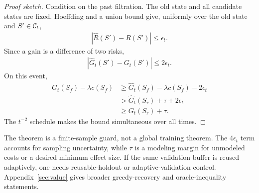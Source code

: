 \begin{proof}[Proof sketch]
Condition on the past filtration. The old state and all candidate states are fixed. Hoeffding and a union bound give, uniformly over the old state and $S'\in\mathcal{C}_t$,
\begin{align*}
\left|\widehat R(S')-R(S')\right|
\le \epsilon_t.
\end{align*}
Since a gain is a difference of two risks,
\begin{align*}
\left|\widehat G_t(S')-G_t(S')\right|
\le 2\epsilon_t.
\end{align*}
On this event,
\begin{align*}
G_t(S_f)-\lambda c(S_f)
&\ge \widehat G_t(S_f)-\lambda c(S_f)-2\epsilon_t\\
&> \widehat G_t(S_r)+\tau+2\epsilon_t\\
&\ge G_t(S_r)+\tau.
\end{align*}
The $t^{-2}$ schedule makes the bound simultaneous over all times.
\end{proof}

The theorem is a finite-sample guard, not a global training theorem. The $4\epsilon_t$ term accounts for sampling uncertainty, while $\tau$ is a modeling margin for unmodeled costs or a desired minimum effect size. If the same validation buffer is reused adaptively, one needs reusable-holdout or adaptive-validation control. Appendix~\ref{sec:value} gives broader greedy-recovery and oracle-inequality statements.
